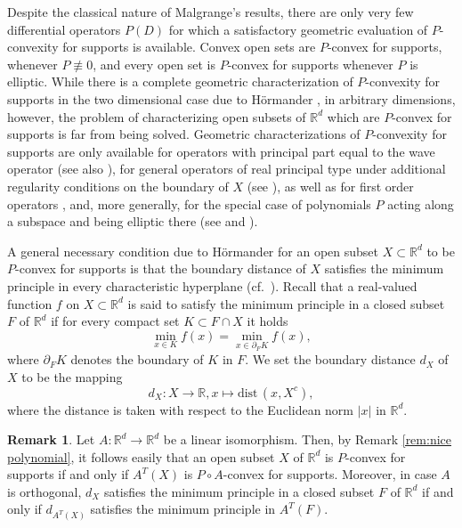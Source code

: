 \documentclass[a4paper,10pt]{amsart}
\newtheorem*{crucial lemma}{Lemma \ref{lem:nice polynomial2}}
\theoremstyle{definition}
\newtheorem{remark}[theorem]{Remark}
\newcommand{\R}{\mathbb{R}}
\newcommand{\dist}{\mbox{dist}\,}
\begin{document}
Despite the classical nature of Malgrange's results, there are only very few differential operators $P(D)$ for which a satisfactory geometric evaluation of $P$-convexity for supports is available. Convex open sets are $P$-convex for supports, whenever $P\not\equiv 0$, and every open set is $P$-convex for supports whenever $P$ is elliptic. While there is a complete geometric characterization of $P$-convexity for supports in the two dimensional case due to H\"ormander \cite[Theorem 10.8.3]{Hor2}, in arbitrary dimensions, however, the problem of characterizing open subsets of $\R^d$ which are $P$-convex for supports is far from being solved. Geometric characterizations of $P$-convexity for supports are only available for operators with principal part equal to the wave operator \cite{Persson1981} (see also \cite[Theorem 10.8.6]{Hor2}), for general operators of real principal type under additional regularity conditions on the boundary of $X$ (see \cite{Persson1993, Tintarev1988, Tintarev1992}), as well as for first order operators \cite{Zachmanoglou69}, and, more generally, for the special case of polynomials $P$ acting along a subspace and being elliptic there (see \cite{Nakane1979} and \cite[Theorem 10.8.5]{Hor2}).

A general necessary condition due to H\"ormander for an open subset $X\subset\R^d$ to be $P$-convex for supports is that the boundary distance of $X$ satisfies the minimum principle in every characteristic hyperplane (cf.\ \cite[Theorem 10.8.1]{Hor2}). Recall that a real-valued function $f$ on $X\subset\R^d$ is said to satisfy the minimum principle in a closed subset $F$ of $\R^d$ if for every compact set $K\subset F\cap X$ it holds
\[\min_{x\in K}f(x)=\min_{x\in\partial_F K}f(x),\]
where $\partial_F K$ denotes the boundary of $K$ in $F$. We set the boundary distance $d_X$ of $X$ to be the mapping
\[d_X:X\rightarrow\R,x\mapsto\dist(x,X^c),\]
where the distance is taken with respect to the Euclidean norm $|x|$ in $\R^d$.

\begin{remark}\label{rem:normal form for P-convexity for operators with flat characteristic cone}
	Let $A:\R^d\rightarrow\R^d$ be a linear isomorphism. Then, by Remark \ref{rem:nice polynomial}, it follows easily that an open subset $X$ of $\R^d$ is $P$-convex for supports if and only if $A^T(X)$ is $P\circ A$-convex for supports. Moreover, in case $A$ is orthogonal, $d_X$ satisfies the minimum principle in a closed subset $F$ of $\R^d$ if and only if $d_{A^T(X)}$ satisfies the minimum principle in $A^T(F)$. 
\end{remark}
\end{document}
